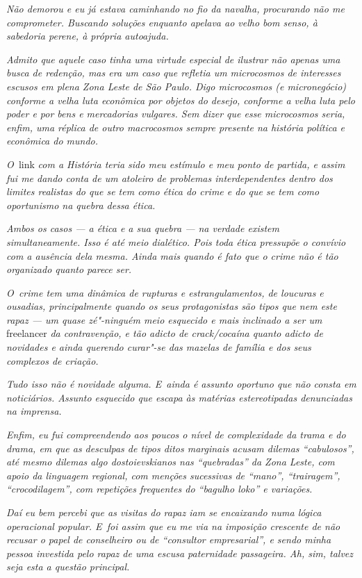 \emph{Não demorou e eu já estava caminhando no fio da navalha,
procurando não me comprometer. Buscando soluções enquanto apelava ao
velho bom senso, à sabedoria perene, à própria autoajuda.}

\emph{Admito que aquele caso tinha uma virtude especial de ilustrar não
apenas uma busca de redenção, mas era um caso que refletia um
microcosmos de interesses escusos em plena Zona Leste de São Paulo. Digo
microcosmos (e micronegócio) conforme a velha luta econômica por objetos
do desejo, conforme a velha luta pelo poder e por bens e mercadorias
vulgares. Sem dizer que esse microcosmos seria, enfim, uma réplica de
outro macrocosmos sempre presente na história política e econômica do
mundo.}

\emph{O~}link \emph{com a História teria sido meu estímulo e meu ponto de
partida, e assim fui me dando conta de um atoleiro de problemas
interdependentes dentro dos limites realistas do que se tem como ética
do crime e do que se tem como oportunismo na quebra dessa ética.}

\emph{Ambos os casos --- a ética e a sua quebra --- na verdade existem
simultaneamente. Isso é até meio dialético. Pois toda ética pressupõe o
convívio com a ausência dela mesma. Ainda mais quando é fato que o crime
não é tão organizado quanto parece ser.}

\emph{O~crime tem uma dinâmica de rupturas e estrangulamentos, de
loucuras e ousadias, principalmente quando os seus protagonistas são
tipos que nem este rapaz --- um quase zé"-ninguém meio esquecido e mais
inclinado a ser um} freelancer \emph{da contravenção, e tão adicto de
crack/cocaína quanto adicto de novidades e ainda querendo curar"-se das
mazelas de família e dos seus complexos de criação.}

\emph{Tudo isso não é novidade alguma. E~ainda é assunto oportuno que
não consta em noticiários. Assunto esquecido que escapa às matérias
estereotipadas denunciadas na imprensa.}

\emph{Enfim, eu fui compreendendo aos poucos o nível de complexidade da
trama e do drama, em que as desculpas de tipos ditos marginais acusam
dilemas ``cabulosos'', até mesmo dilemas algo dostoievskianos nas
``quebradas'' da Zona Leste, com apoio da linguagem regional, com
menções sucessivas de ``mano'', ``trairagem'', ``crocodilagem'', com
repetições frequentes do ``bagulho loko'' e variações.}

\emph{Daí eu bem percebi que as visitas do rapaz iam se encaixando numa
lógica operacional popular. E~foi assim que eu me via na imposição
crescente de não recusar o papel de conselheiro ou de ``consultor
empresarial'', e sendo minha pessoa investida pelo rapaz de uma escusa
paternidade passageira. Ah, sim, talvez seja esta a questão principal.}

